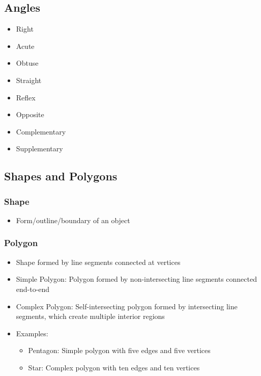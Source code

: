 \documentclass{article}
\begin{document}
    \subsection{Angles}
        \begin{itemize}
            \item Right
            \item Acute
            \item Obtuse
            \item Straight
            \item Reflex
            \item Opposite
            \item Complementary
            \item Supplementary
        \end{itemize}
        
    \subsection{Shapes and Polygons}
    
        \subsubsection{Shape}
            \begin{itemize}
                \item Form/outline/boundary of an object
            \end{itemize}
            
        \subsubsection{Polygon}
            \begin{itemize}
                \item Shape formed by line segments connected at vertices
                \item Simple Polygon: Polygon formed by non-intersecting line segments connected end-to-end
                \item Complex Polygon: Self-intersecting polygon formed by intersecting line segments, which create multiple interior regions
                \item Examples:
                \begin{itemize}
                    \item Pentagon: Simple polygon with five edges and five vertices
                    \item Star: Complex polygon with ten edges and ten vertices
                \end{itemize}
            \end{itemize}
\end{document}
